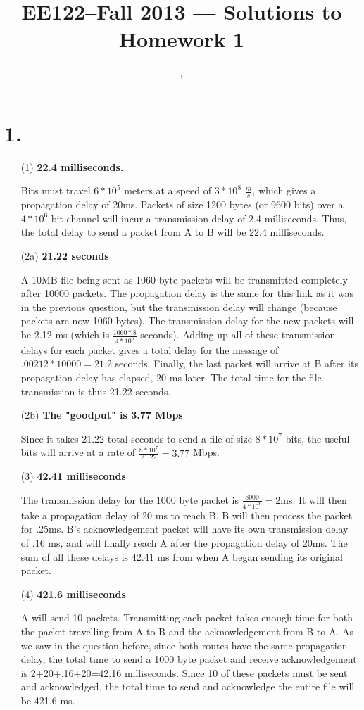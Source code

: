 \documentclass[11pt]{article}
\title{EE122--Fall 2013 --- Solutions to Homework 1}
\author{\Name, \texttt{\Login}}
\begin{document}
\maketitle

\section*{1.}

\begin{itemize}
\item[(1)] \textbf{22.4 milliseconds.}

Bits must travel $6*10^5$ meters at a speed of $3*10^8$ $\frac{m}{s}$, which gives a propagation delay of 20ms. Packets of size 1200 bytes (or 9600 bits) over a $4*10^6$ bit channel will incur a transmission delay of 2.4 milliseconds. Thus, the total delay to send a packet from A to B will be 22.4 milliseconds.
\item[(2a)] \textbf{21.22 seconds}

A 10MB file being sent as 1060 byte packets will be transmitted completely after 10000 packets. The propagation delay is the same for this link as it was in the previous question, but the transmission delay will change (because packets are now 1060 bytes). The transmission delay for the new packets will be 2.12 ms (which is $\frac{1060*8}{4*10^6}$ seconds). Adding up all of these transmission delays for each packet gives a total delay for the message of $.00212*10000=21.2$ seconds. Finally, the last packet will arrive at B after its propagation delay has elapsed, 20 ms later. The total time for the file transmission is thus 21.22 seconds.
\item[(2b)] \textbf{The "goodput" is 3.77 Mbps}

Since it takes 21.22 total seconds to send a file of size $8*10^7$ bits, the useful bits will arrive at a rate of $\frac{8*10^7}{21.22}=3.77$ Mbps. 
\item[(3)] \textbf{42.41 milliseconds}

The transmission delay for the 1000 byte packet is $\frac{8000}{4*10^6}=2$ms. It will then take a propagation delay of 20 ms to reach B. B will then process the packet for .25ms. B's acknowledgement packet will have its own transmission delay of .16 ms, and will finally reach A after the propagation delay of 20ms. The sum of all these delays is 42.41 ms from when A began sending its original packet.
\item[(4)] \textbf{421.6 milliseconds}

A will send 10 packets. Transmitting each packet takes enough time for both the packet travelling from A to B and the acknowledgement from B to A. As we saw in the question before, since both routes have the same propagation delay, the total time to send a 1000 byte packet and receive acknowledgement is 2+20+.16+20=42.16 milliseconds. Since 10 of these packets must be sent and acknowledged, the total time to send and acknowledge the entire file will be 421.6 ms.
\end{itemize}
\end{document}
